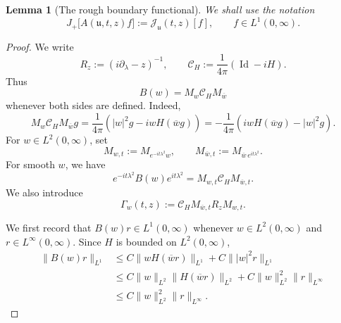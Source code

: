 \documentclass[10pt]{article}
\newtheorem{lemma}[theorem]{Lemma}
\numberwithin{equation}{section}
\numberwithin{theorem}{section}
\begin{document}
\begin{appendix}
\begin{lemma}[The rough boundary functional]
We shall use the notation
\begin{equation}
\label{A7-boundary-notation}
J_+\bigl[A(\mathfrak u,t,z)f\bigr]
:=
\mathcal J_{\mathfrak u}(t,z)[f],
\qquad f\in L^1(0,\infty).
\end{equation}
\end{lemma}

\begin{proof}
We write
\[
R_z:=(i\partial_\lambda-z)^{-1},
\qquad
\mathcal C_H:=\frac1{4\pi}(\operatorname{Id}-iH).
\]
Thus
\[
B(w)=M_w\mathcal C_HM_{\overline w}
\]
whenever both sides are defined. Indeed,
\[
M_w\mathcal C_HM_{\overline w}g
=
\frac1{4\pi}
\left(
|w|^2g-iwH(\overline wg)
\right)
=
-\frac1{4\pi}
\left(
iwH(\overline wg)-|w|^2g
\right).
\]
For \(w\in L^2(0,\infty)\), set
\[
M_{w,t}:=M_{e^{-it\lambda^2}w},
\qquad
M_{\overline w,t}:=M_{\overline w\,e^{it\lambda^2}}.
\]
For smooth \(w\), we have
\[
e^{-it\lambda^2}B(w)e^{it\lambda^2}
=
M_{w,t}\mathcal C_HM_{\overline w,t}.
\]
We also introduce
\begin{equation}
\label{A7-Gamma-def}
\Gamma_w(t,z)
:=
\mathcal C_HM_{\overline w,t}R_zM_{w,t}.
\end{equation}

We first record that \(B(w)r\in L^1(0,\infty)\) whenever
\(w\in L^2(0,\infty)\) and \(r\in L^\infty(0,\infty)\). Since \(H\) is bounded
on \(L^2(0,\infty)\),
\[
\begin{aligned}
\|B(w)r\|_{L^1}
&\le
C\|wH(\overline wr)\|_{L^1}
+
C\||w|^2r\|_{L^1}       \\
&\le
C\|w\|_{L^2}\|H(\overline wr)\|_{L^2}
+
C\|w\|_{L^2}^2\|r\|_{L^\infty}  \\
&\le
C\|w\|_{L^2}^2\|r\|_{L^\infty}.
\end{aligned}
\]


\end{proof}
\end{appendix}
\end{document}
